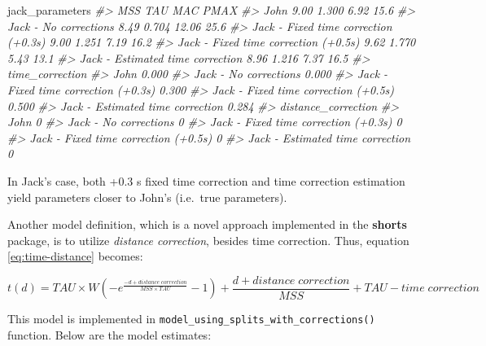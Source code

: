 \documentclass[fleqn,10pt,lineno]{wlpeerj} %
\newenvironment{Shaded}{\begin{snugshade}}{\end{snugshade}}
\newcommand{\CommentTok}[1]{\textcolor[rgb]{0.56,0.35,0.01}{\textit{#1}}}
\newcommand{\NormalTok}[1]{#1}
\begin{document}
\begin{Shaded}
\begin{Highlighting}[]
\NormalTok{jack\_parameters}
\CommentTok{\#\textgreater{}                                       MSS   TAU   MAC PMAX}
\CommentTok{\#\textgreater{} John                                 9.00 1.300  6.92 15.6}
\CommentTok{\#\textgreater{} Jack {-} No corrections                8.49 0.704 12.06 25.6}
\CommentTok{\#\textgreater{} Jack {-} Fixed time correction (+0.3s) 9.00 1.251  7.19 16.2}
\CommentTok{\#\textgreater{} Jack {-} Fixed time correction (+0.5s) 9.62 1.770  5.43 13.1}
\CommentTok{\#\textgreater{} Jack {-} Estimated time correction     8.96 1.216  7.37 16.5}
\CommentTok{\#\textgreater{}                                      time\_correction}
\CommentTok{\#\textgreater{} John                                           0.000}
\CommentTok{\#\textgreater{} Jack {-} No corrections                          0.000}
\CommentTok{\#\textgreater{} Jack {-} Fixed time correction (+0.3s)           0.300}
\CommentTok{\#\textgreater{} Jack {-} Fixed time correction (+0.5s)           0.500}
\CommentTok{\#\textgreater{} Jack {-} Estimated time correction               0.284}
\CommentTok{\#\textgreater{}                                      distance\_correction}
\CommentTok{\#\textgreater{} John                                                   0}
\CommentTok{\#\textgreater{} Jack {-} No corrections                                  0}
\CommentTok{\#\textgreater{} Jack {-} Fixed time correction (+0.3s)                   0}
\CommentTok{\#\textgreater{} Jack {-} Fixed time correction (+0.5s)                   0}
\CommentTok{\#\textgreater{} Jack {-} Estimated time correction                       0}
\end{Highlighting}
\end{Shaded}

In Jack's case, both +0.3 s fixed time correction and time correction estimation yield parameters closer to John's (i.e.~true parameters).

Another model definition, which is a novel approach implemented in the \textbf{shorts} package, is to utilize \emph{distance correction}, besides time correction. Thus, equation \eqref{eq:time-distance} becomes:

\begin{equation}
  t(d) = TAU \times W(-e^{\frac{-d + distance \; correction}{MSS \times TAU}} - 1) + \frac{d + distance \; correction}{MSS} + TAU - time \; correction \label{eq:distance-correction}
\end{equation}

This model is implemented in \texttt{model\_using\_splits\_with\_corrections()} function. Below are the model estimates:
\end{document}
